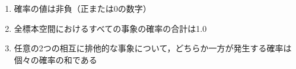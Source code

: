 \begin{enumerate}
    \item 確率の値は非負（正または0の数字）
    \item 全標本空間におけるすべての事象の確率の合計は1.0
    \item 任意の2つの相互に排他的な事象について，どちらか一方が発生する確率は個々の確率の和である
\end{enumerate}
